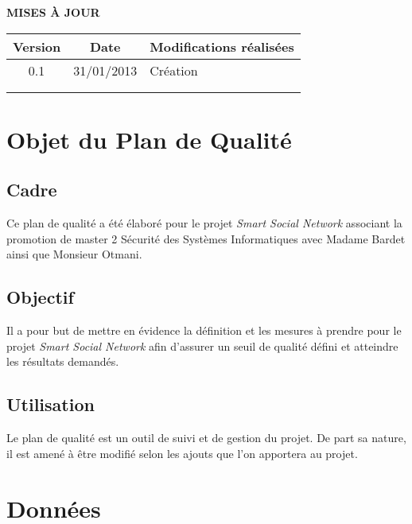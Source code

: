 \documentclass[a4paper,11pt,french]{article}
\begin{document}
\makeFirstPage
\clearpage

\vspace*{1cm}
\begin{center}
\textbf{\huge{MISES À JOUR}}\\
\vspace*{3cm}
	\begin{tabularx}{16cm}{|c|c|X|}
	\hline
	\bfseries{Version} & \bfseries{Date} & \bfseries{Modifications réalisées}\\
	\hline
	0.1 & 31/01/2013 & Création\\
	\hline
	&&\\
	\hline
	&&\\
	\hline
	\end{tabularx}
\end{center}

\clearpage
\tableofcontents
\clearpage

\renewcommand\labelitemi{\textbullet} %
\renewcommand\labelitemii{$\circ$} %
\section{Objet du Plan de Qualité}
\subsection{Cadre}
	Ce plan de qualité a été élaboré pour le projet \emph{Smart Social
Network} associant la promotion de master 2 Sécurité des Systèmes
Informatiques avec Madame Bardet ainsi que Monsieur Otmani.

\subsection{Objectif}
	Il a pour but de mettre en évidence la définition et les mesures à
prendre pour le projet \emph{Smart Social Network} afin d'assurer un seuil de
qualité défini et atteindre les résultats demandés.

\subsection{Utilisation}
	Le plan de qualité est un outil de suivi et de gestion du projet.
De part sa nature, il est amené à être modifié selon les ajouts que l'on
apportera au projet.

\newpage
\section{Données}
\end{document}

